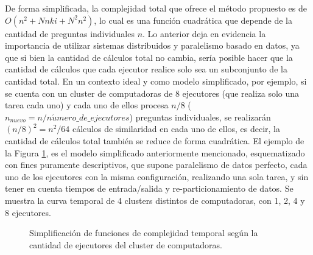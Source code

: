 \bigskip De forma simplificada, la complejidad total que ofrece el método propuesto es de \(O(n^2 + Nnki + N^2n^2)\), lo cual es una función cuadrática que depende de la cantidad de preguntas individuales \(n\). Lo anterior deja en evidencia la importancia de utilizar sistemas distribuidos y paralelismo basado en datos, ya que si bien la cantidad de cálculos total no cambia, sería posible hacer que la cantidad de cálculos que cada ejecutor realice solo sea un subconjunto de la cantidad total. En un contexto ideal y como modelo simplificado, por ejemplo, si se cuenta con un cluster de computadoras de \(8\) ejecutores (que realiza solo una tarea cada uno) y cada uno de ellos procesa \(n/8\) (\(n_{nuevo}=n / n\acute{u}mero\_de\_ejecutores\)) preguntas individuales, se realizarán \((n/8)^2=n^2/64\) cálculos de similaridad en cada uno de ellos, es decir, la cantidad de cálculos total también se reduce de forma cuadrática. El ejemplo de la Figura \ref{fig:complejidad_temporal_figura}, es el modelo simplificado anteriormente mencionado, esquematizado con fines puramente descriptivos, que supone paralelismo de datos perfecto, cada uno de los ejecutores con la misma configuración, realizando una sola tarea, y sin tener en cuenta tiempos de entrada/salida y re-particionamiento de datos. Se muestra la curva temporal de 4 clusters distintos de computadoras, con 1, 2, 4 y 8 ejecutores.

\begin{figure}[h!]
	\centering
	\caption{Simplificación de funciones de complejidad temporal según la cantidad de ejecutores del cluster de computadoras.}
	\label{fig:complejidad_temporal_figura}
\end{figure}

